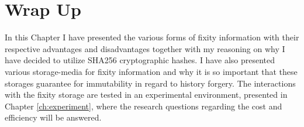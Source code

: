 \section{Wrap Up}
In this Chapter I have presented the various forms of fixity information with their respective advantages and disadvantages together with my reasoning on why I have decided to utilize SHA256 cryptographic hashes. I have also presented various storage-media for fixity information and why it is so important that these storages guarantee for immutability in regard to history forgery. The interactions with the fixity storage are tested in an experimental environment, presented in Chapter \ref{ch:experiment}, where the research questions regarding the cost and efficiency will be answered.